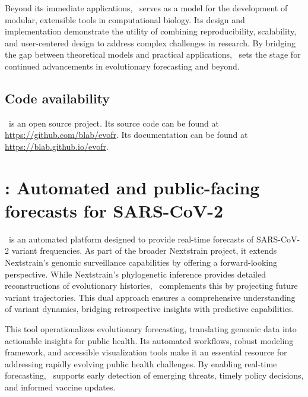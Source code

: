 Beyond its immediate applications, \evofr\ serves as a model for the development of modular, extensible tools in computational biology.
Its design and implementation demonstrate the utility of combining reproducibility, scalability, and user-centered design to address complex challenges in research. 
By bridging the gap between theoretical models and practical applications, \evofr\ sets the stage for continued advancements in evolutionary forecasting and beyond.

\subsection*{Code availability}

\evofr\ is an open source project.
Its source code can be found at \href{https://github.com/blab/evofr}{https://github.com/blab/evofr}.
Its documentation can be found at \href{https://blab.github.io/evofr}{https://blab.github.io/evofr}.

\section{\forecastsNcov: Automated and public-facing forecasts for SARS-CoV-2}


\forecastsNcov\ is an automated platform designed to provide real-time forecasts of SARS-CoV-2 variant frequencies.
As part of the broader Nextstrain project, it extends Nextstrain’s genomic surveillance capabilities by offering a forward-looking perspective.
While Nextstrain’s phylogenetic inference provides detailed reconstructions of evolutionary histories, \forecastsNcov\ complements this by projecting future variant trajectories.
This dual approach ensures a comprehensive understanding of variant dynamics, bridging retrospective insights with predictive capabilities.

This tool operationalizes evolutionary forecasting, translating genomic data into actionable insights for public health.
Its automated workflows, robust modeling framework, and accessible visualization tools make it an essential resource for addressing rapidly evolving public health challenges.
By enabling real-time forecasting, \forecastsNcov\ supports early detection of emerging threats, timely policy decisions, and informed vaccine updates.

